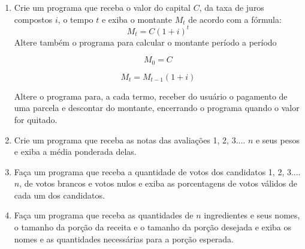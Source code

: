 \begin{enumerate}
	Altere também o programa para calcular o montante período a período 
	\begin{multicols}{2}
		\begin{equation*}
			M_0 = C
		\end{equation*}
		
		\begin{equation*}
			M_t = M_{t-1} + C i
		\end{equation*}
	\end{multicols}	
	Altere o programa para, a cada termo, receber do usuário o pagamento de uma parcela e descontar do montante, encerrando o programa quando o valor for quitado.		

\quebra	 

	\item Crie um programa que receba o valor do capital $C$, da taxa de juros compostos $i$, o tempo $t$ e exiba o montante $M_t$ de acordo com a fórmula:
	\begin{equation*}
		M_t = C (1 + i)^t
	\end{equation*}	
	Altere também o programa para calcular o montante período a período 
	\begin{multicols}{2}	
		\begin{equation*}
			M_0 = C
		\end{equation*}		

		\begin{equation*}
			M_t = M_{t-1} (1 + i)
		\end{equation*}
	\end{multicols}
	Altere o programa para, a cada termo, receber do usuário o pagamento de uma parcela e descontar do montante, encerrando o programa quando o valor for quitado. 

	\item Crie um programa que receba as notas das avaliações 1, 2, 3.... $n$ e seus pesos e exiba a média ponderada delas.

	\item Faça um programa que receba a quantidade de votos dos candidatos 1, 2, 3.... $n$, de votos brancos e votos nulos e exiba as porcentagens de votos válidos de cada um dos candidatos.			 

	\item Faça um programa que receba as quantidades de $n$ ingredientes e seus nomes, o tamanho da porção da receita e o tamanho da porção desejada e exiba os nomes e as quantidades necessárias para a porção esperada.	


\end{enumerate}
